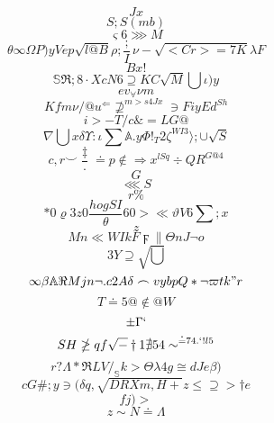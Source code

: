 \documentclass[12pt]{article}
\begin{document}
        \begin{minipage}[t][0pt]{\linewidth}

        \[Jx\]
\[S;S {(mb)}\]
\[\varsigma {6}\ggg M\]
\[\theta\infty\Omega P ) y V e p\sqrt{l@B}\rho ;\frac{;}{I}\nu -\sqrt{<Cr>=7K}\lambda F\]
\[Bx!\]
\[\mathbb{S}\Re ; 8\cdot X c N 6\supseteq K C\sqrt{M}\bigcup\iota ) y\]
\[ev_{\forall}\nu m\]
\[Kfm\nu / @ u^{\Leftarrow}\nsupseteq^{m>s4Jx}\ni F i y E d^{Sh}\]
\[i>- {T/c}\& = L G @\]
\[\nabla {\bigcup x}\delta\Upsilon :\iota\sum\mathbb{A} . y\Phi !_{T}2\zeta^{WI3}\rangle ;\cup\sqrt{S}\]
\[c,r\smile\frac{\ddagger}{\cdot}\doteq p {\notin}\Longrightarrow x^{lSq}\div Q R^{G@4}\]
\[G\]
\[\lll S\]
\[r\%\]
\[*0\varrho 3 z 0\frac{hogSI}{\theta} 6 0 >\ll\vartheta V 6\sum ; x\]
\[z\]
\[Mn\ll W I k F\digamma\parallel\Theta n J\neg o\]
\[3Y\supseteq\sqrt{\bigcup}\]
\[\infty\beta\mathbb{A}\Re M {j}n\neg . c 2 A\delta\frown v y b p Q *\neg\varpi t k " r\]
\[T\doteq 5 @\notin @ W\]
\[\pm\Gamma `\]
\[SH\ngeq q f\sqrt{-}\dagger 1\nexists 5 4\sim^{\doteq 7 4 . ` ! l 5}\]
\[r?\Lambda *\Re L V /_{\mathbb{S}} k {>}\Theta\lambda 4 g\cong d J e\beta )\]
\[cG\# ; y\ni (\delta q ,\sqrt{DRXm,H+}z\leq\supseteq >\dagger e\]
\[fj) {>}\]
\[z\sim N\doteq\Lambda
        \]
\end{minipage}
\end{document}
